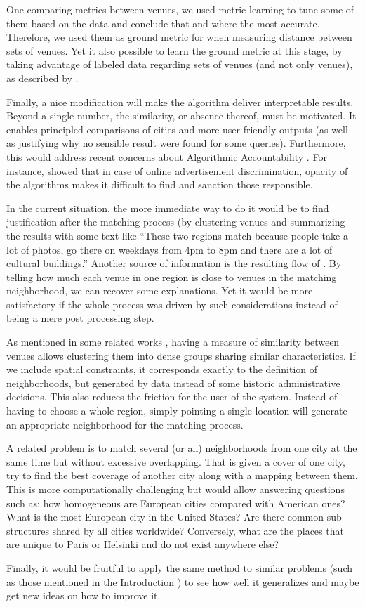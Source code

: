 One comparing metrics between venues, we used metric learning to tune some of
them based on the data and conclude that \eucl{} and \lmnn{} where the most
accurate. Therefore, we used them as ground metric for \emd{} when measuring
distance between sets of venues. Yet it also possible to learn the ground
metric at this stage, by taking advantage of labeled data regarding sets of
venues (and not only venues), as described by \textcite{LearnEMD14}.

Finally, a nice modification will make the algorithm deliver interpretable
results. Beyond a single number, the similarity, or absence thereof, must be
motivated. It enables principled comparisons of cities and more user friendly
outputs (as well as justifying why no sensible result were found for some
queries).  Furthermore, this would address recent concerns about Algorithmic
Accountability \autocite{Accountability13}. For instance,
\textcite{Discrimination13} showed that in case of online advertisement
discrimination, opacity of the algorithms makes it difficult to find and
sanction those responsible.

In the current situation, the more immediate way to do it would be to find
justification after the matching process (by clustering venues and summarizing
the results with some text like \enquote{These two regions match because people
take a lot of photos, go there on weekdays from 4pm to 8pm and there are a
lot of cultural buildings.} Another source of information is the resulting
flow of \emd{}. By telling how much each venue in one region is close to venues
in the matching neighborhood, we can recover some explanations.  Yet it would
be more satisfactory if the whole process was driven by such considerations
instead of being a mere post processing step.

\medskip

As mentioned in some related works \autocites{Livehoods12}{Hoodsquare13},
having a measure of similarity between venues allows clustering them into
dense groups sharing similar characteristics. If we include spatial
constraints, it corresponds exactly to the definition of neighborhoods, but
generated by data instead of some historic administrative decisions. This
also reduces the friction for the user of the system. Instead of having to
choose a whole region, simply pointing a single location will generate an
appropriate neighborhood for the matching process.

A related problem is to match several (or all) neighborhoods from one city at
the same time but without excessive overlapping. That is given a cover of one
city, try to find the best coverage of another city along with a mapping
between them.  This is more computationally challenging but would allow
answering questions such as: how homogeneous are European cities compared with
American ones? What is the most European city in the United States? Are there
common sub structures shared by all cities worldwide? Conversely, what are the
places that are unique to Paris or Helsinki and do not exist anywhere else?

Finally, it would be fruitful to apply the same method to similar problems
(such as those mentioned in the Introduction ) to see
how well it generalizes and maybe get new ideas on how to improve it.

\endgroup
